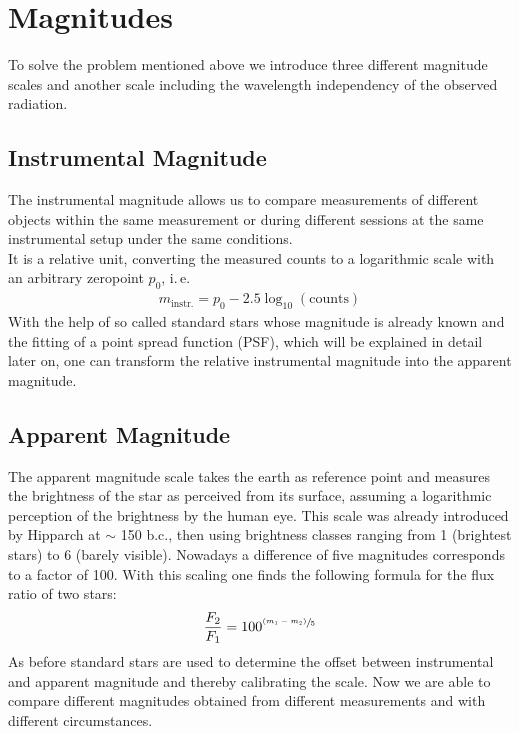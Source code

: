 \section{Magnitudes}
To solve the problem mentioned above we introduce three different magnitude scales and another scale including the wavelength independency of the observed radiation.
\subsection{Instrumental Magnitude}
The instrumental magnitude allows us to compare measurements of different objects within the same measurement or during different sessions at the same instrumental setup under the same conditions. \\
It is a relative unit, converting the measured counts to a logarithmic scale with an arbitrary zeropoint $p_0$, i.\,e.
\begin{align}
		m_{\text{instr.}} = p_0 - 2.5\log_{10}(\text{counts}) \label{eq1.4}
	\end{align}
With the help of so called standard stars whose magnitude is already known and the fitting of a point spread function (PSF), which will be explained in detail later on, one can transform the relative instrumental magnitude into the apparent magnitude.
\subsection{Apparent Magnitude}
The apparent magnitude scale takes the earth as reference point and measures the brightness of the star as perceived from its surface, assuming a logarithmic perception of the brightness by the human eye. This scale was already introduced by Hipparch at $\sim$ 150 b.c., then using brightness classes ranging from 1 (brightest stars) to 6 (barely visible). Nowadays a difference of five magnitudes corresponds to a factor of 100.
With this scaling one finds the following formula for the flux ratio of two stars: 
\begin{align}
	\frac{F_2}{F_1} = 100^{\sfrac{(m_1-m_2)}{5}}
\end{align}
As before standard stars are used to determine the offset between instrumental and apparent magnitude and thereby calibrating the scale. Now we are able to compare different magnitudes obtained from different measurements and with different circumstances.
